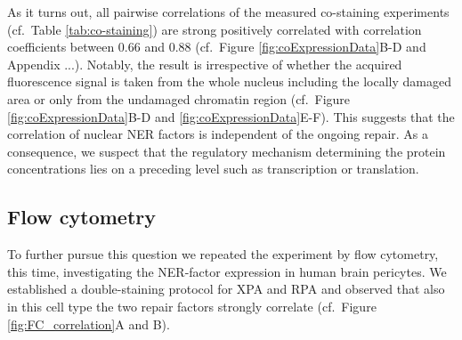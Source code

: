 \noindent As it turns out, all pairwise correlations of the measured co-staining experiments (cf.\ Table \ref{tab:co-staining}) are strong positively correlated with correlation coefficients between 0.66 and 0.88 (cf.\ Figure \ref{fig:coExpressionData}B-D and Appendix ...). Notably, the result is irrespective of whether the acquired fluorescence signal is taken from the whole nucleus including the locally damaged area or only from the undamaged chromatin region (cf.\ Figure \ref{fig:coExpressionData}B-D and \ref{fig:coExpressionData}E-F). This suggests that the correlation of nuclear NER factors is independent of the ongoing repair. As a consequence, we suspect that the regulatory mechanism determining the protein concentrations lies on a preceding level such as transcription or translation.\\  



\subsection{Flow cytometry}

To further pursue this question we repeated the experiment by flow cytometry, this time, investigating the NER-factor expression in human brain pericytes. We established a double-staining protocol for XPA and RPA and observed that also in this cell type the two repair factors strongly correlate (cf.\ Figure \ref{fig:FC_correlation}A and B).    

 

